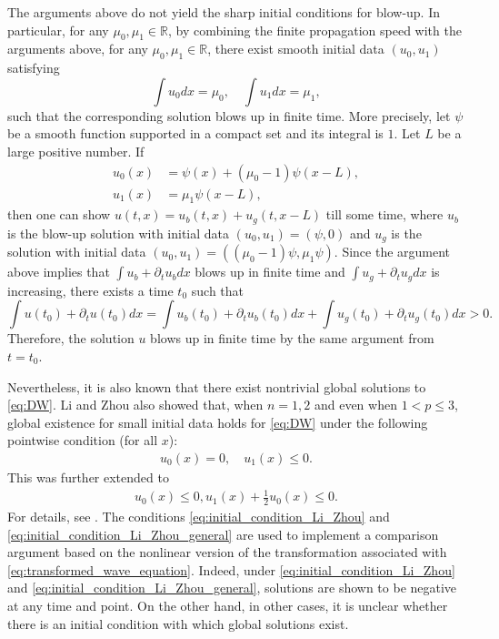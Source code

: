 \documentclass[reqno]{amsart}
\begin{document}
The arguments above do not yield
the sharp initial conditions for blow-up.
In particular, for any $\mu_0, \mu_1 \in \mathbb{R}$,
by combining the finite propagation speed
with the arguments above,
for any $\mu_0, \mu_1 \in \mathbb{R}$,
there exist smooth initial data $(u_0, u_1)$
satisfying
	\[
	\int u_0 dx = \mu_0,
	\quad
	\int u_1 dx = \mu_1,
	\]
such that the corresponding solution blows up in finite time.
More precisely,
let $\psi$ be a smooth function supported in a compact set
and its integral is $1$.
Let $L$ be a large positive number.
If
	\begin{align*}
	u_0(x) &= \psi(x) + (\mu_0-1) \psi(x-L), \\
	u_1(x) &= \mu_1 \psi(x-L),
	\end{align*}
then one can show $u(t,x) = u_b(t,x) + u_g(t,x-L)$ till some time,
where $u_b$ is the blow-up solution with initial data $(u_0, u_1) = (\psi,0)$
and $u_g$ is the solution with initial data $(u_0, u_1) = ((\mu_0-1)\psi, \mu_1 \psi)$.
Since the argument above implies that
$\int u_b + \partial_t u_b dx$ blows up in finite time
and $\int u_g + \partial_t u_g dx$ is increasing,
there exists a time $t_0$ such that
	\[
	\int u(t_0) + \partial_t u(t_0) dx
	= \int u_b(t_0) + \partial_t u_b(t_0) dx + \int u_g(t_0) + \partial_t u_g(t_0) dx
	> 0.
	\]
Therefore, the solution $u$ blows up in finite time
by the same argument from $t=t_0$.

Nevertheless,
it is also known that
there exist nontrivial global solutions to \eqref{eq:DW}.
Li and Zhou \cite{LZ95} also showed that,
when $n = 1, 2$ and even when $1 < p \leq 3$,
global existence for small initial data holds for \eqref{eq:DW}
under the following pointwise condition (for all $x$):
	\begin{align}
	u_0(x) = 0,
	\quad
	u_1(x) \leq 0.
	\label{eq:initial_condition_Li_Zhou}
	\end{align}
This was further extended to
	\begin{align}
	u_0(x) \leq 0,
	u_1(x) + \frac 1 2 u_0(x) \leq 0.
	\label{eq:initial_condition_Li_Zhou_general}
	\end{align}
For details, see \cite{FG25b}.
The conditions \eqref{eq:initial_condition_Li_Zhou}
and \eqref{eq:initial_condition_Li_Zhou_general}
are used to implement a comparison argument
based on the nonlinear version of
the transformation associated with \eqref{eq:transformed_wave_equation}.
Indeed, under \eqref{eq:initial_condition_Li_Zhou}
and \eqref{eq:initial_condition_Li_Zhou_general},
solutions are shown to be negative at any time and point.
On the other hand, in other cases,
it is unclear whether
there is an initial condition
with which global solutions exist.
\end{document}
